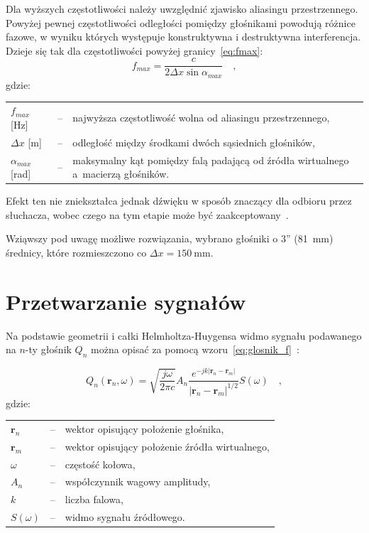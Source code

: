\documentclass[12pt]{oska}
\let\Oldsection\section
\renewcommand{\section}{\FloatBarrier\Oldsection}
\begin{document}
Dla wyższych częstotliwości należy
uwzględnić zjawisko aliasingu przestrzennego. Powyżej pewnej częstotliwości
odległości pomiędzy głośnikami powodują różnice fazowe, w wyniku których występuje
konstruktywna i destruktywna interferencja. Dzieje się tak dla częstotliwości
powyżej granicy~\eqref{eq:fmax}:
\begin{equation}
  f_{max}=\frac{c}{2\Delta x \sin{\alpha_{max}}} \quad, \label{eq:fmax}
\end{equation}
gdzie:\\
	\indent \begin{tabular}{l c p{}}
			$f_{max}$ [\si{\hertz}] & -- & najwyższa częstotliwość wolna od aliasingu przestrzennego, \\
			$\Delta x$ [\si{\metre}] & -- & odległość między środkami dwóch sąsiednich głośników, \\
				$\alpha_{max}$ [\si{\radian}] & -- & maksymalny kąt pomiędzy falą padającą od źródła wirtualnego a~macierzą głośników.\\
			\end{tabular}
		
Efekt ten nie zniekształca jednak dźwięku w sposób znaczący dla odbioru przez słuchacza,
wobec czego na tym etapie może być zaakceptowany~\cite{hq_rendering}.

Wziąwszy pod uwagę możliwe rozwiązania, wybrano głośniki o 3''
(\SI{81}{\milli\meter}) średnicy, które rozmieszczono co
$\Delta x=\SI{150}{\milli\meter}$.

\section{Przetwarzanie sygnałów}\label{s:algorithm}

Na podstawie geometrii i całki Helmholtza-Huygensa 
widmo sygnału podawanego na $n$-ty głośnik $Q_n$ można opisać za pomocą
wzoru~\eqref{eq:glosnik_f}~\cite{delay}:

\begin{equation}
  Q_n(\bm{r}_n,\omega) = \sqrt{\frac{j\omega}{2\pi c}} A_n \frac {e^{-jk|\bm{r}_n-\bm{r}_m|}}{|\bm{r}_n-\bm{r}_m|^{1/2}} S(\omega) \quad,
  \label{eq:glosnik_f}
\end{equation}
gdzie:\\
	\indent \begin{tabular}{l c p{}}
				$\bm{r}_n$ & -- & wektor opisujący położenie głośnika, \\
				$\bm{r}_m$ & -- & wektor opisujący położenie źródła wirtualnego,\\
				$\omega$ & -- & częstość kołowa, \\
				$A_n$ & -- & współczynnik wagowy amplitudy,\\
				$k$ & -- & liczba falowa,\\
				$S(\omega)$ & -- & widmo sygnału źródłowego.
			\end{tabular}\\
\end{document}
